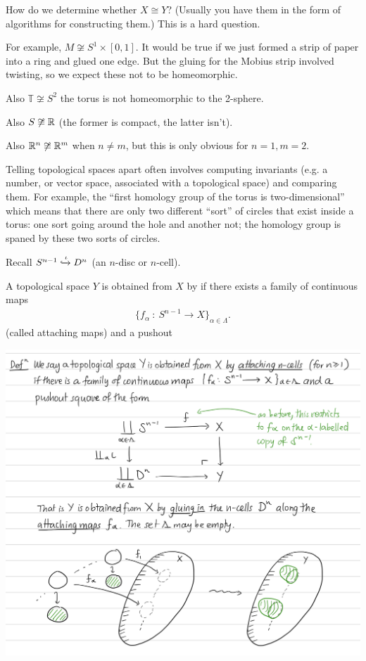 \begin{question}
  How do we determine whether $X \cong Y$? (Usually you have them in the form of algorithms for constructing
  them.) This is a hard question.

  For example, $M \not\cong S^1 \times [0, 1]$. It would be true if we just formed a strip of paper
  into a ring and glued one edge. But the gluing for the Mobius strip involved twisting, so we
  expect these not to be homeomorphic.

  Also $\mathds{T} \not\cong S^2$ the torus is not homeomorphic to the 2-sphere.

  Also $S \not\cong \mathbb{R}$ (the former is compact, the latter isn't).

  Also $\mathbb{R}^n \not\cong \mathbb{R}^m$ when $n \neq m$, but this is only obvious for $n=1, m=2$.

  Telling topological spaces apart often involves computing invariants (e.g. a number, or vector
  space, associated with a topological space) and comparing them. For example, the ``first homology
  group of the torus is two-dimensional​'' which means that there are only two different ``sort​'' of
  circles that exist inside a torus: one sort going around the hole and another not; the homology
  group is spaned by these two sorts of circles.
\end{question}

Recall $S^{n-1} \xhookrightarrow{\rm \iota} D^n$ (an $n$-disc or $n$-cell).

\begin{definition}
  A topological space $Y$ is obtained from $X$ by  if there exists a family of continuous
  maps
  \begin{align*}
    \{f_\alpha ~:~ S^{n-1} \to X\}_{\alpha \in \Lambda}.
  \end{align*}
  (called attaching maps) and a pushout

\begin{mdframed}
\includegraphics[width=400pt]{img/analysis--berkeley-202a-topology-55c5.png}
\end{mdframed}
\end{definition}

